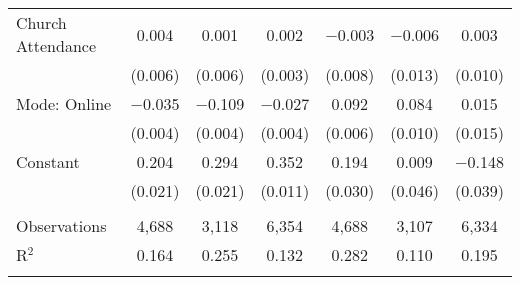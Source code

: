 \begin{table}[!htbp]
\begin{tabular}{@{\extracolsep{0pt}}lcccccc}
  Church Attendance & 0.004 & 0.001 & 0.002 & $-$0.003 & $-$0.006 & 0.003 \\ 
  & (0.006) & (0.006) & (0.003) & (0.008) & (0.013) & (0.010) \\ 
  Mode: Online & $-$0.035 & $-$0.109 & $-$0.027 & 0.092 & 0.084 & 0.015 \\ 
  & (0.004) & (0.004) & (0.004) & (0.006) & (0.010) & (0.015) \\ 
  Constant & 0.204 & 0.294 & 0.352 & 0.194 & 0.009 & $-$0.148 \\ 
  & (0.021) & (0.021) & (0.011) & (0.030) & (0.046) & (0.039) \\ 
 \hline \\[-1.8ex] 
Observations & 4,688 & 3,118 & 6,354 & 4,688 & 3,107 & 6,334 \\ 
R$^{2}$ & 0.164 & 0.255 & 0.132 & 0.282 & 0.110 & 0.195 \\ 
\hline 
\hline \\[-1.8ex] 
\end{tabular} 
\end{table} 
